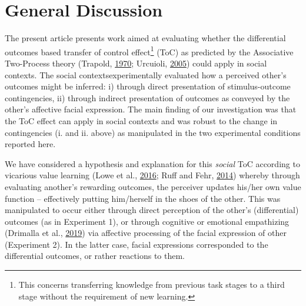 \documentclass[]{elsarticle} %
\begin{document}
\hypertarget{general-discussion}{%
\section{General Discussion}\label{general-discussion}}

The present article presents work aimed at evaluating whether the
differential outcomes based transfer of control effect\footnote{This
  concerns transferring knowledge from previous task stages to a third
  stage without the requirement of new learning.} (ToC) as predicted by
the Associative Two-Process theory (Trapold,
\protect\hyperlink{ref-trapold1970expectancies}{1970}; Urcuioli,
\protect\hyperlink{ref-urcuioli2005behavioral}{2005}) could apply in
social contexts. The social contextsexperimentally evaluated how a
perceived other's outcomes might be inferred: i) through direct
presentation of stimulus-outcome contingencies, ii) through indirect
presentation of outcomes as conveyed by the other's affective facial
expression. The main finding of our investigation was that the ToC
effect can apply in social contexts and was robust to the change in
contingencies (i. and ii. above) as manipulated in the two experimental
conditions reported here.

We have considered a hypothesis and explanation for this \emph{social}
ToC according to vicarious value learning (Lowe et al.,
\protect\hyperlink{ref-lowe2016minimalist}{2016}; Ruff and Fehr,
\protect\hyperlink{ref-ruff2014neurobiology}{2014}) whereby through
evaluating another's rewarding outcomes, the perceiver updates his/her
own value function -- effectively putting him/herself in the shoes of
the other. This was manipulated to occur either through direct
perception of the other's (differential) outcomes (as in Experiment 1),
or through cognitive or emotional empathizing (Drimalla et al.,
\protect\hyperlink{ref-drimalla2019face}{2019}) via affective processing
of the facial expression of other (Experiment 2). In the latter case,
facial expressions corresponded to the differential outcomes, or rather
reactions to them.
\end{document}
